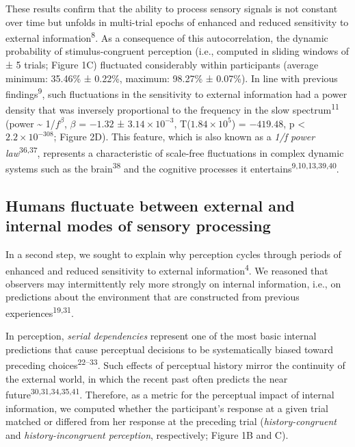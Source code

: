 \documentclass[
]{article}
\begin{document}
These results confirm that the ability to process sensory signals is not
constant over time but unfolds in multi-trial epochs of enhanced and
reduced sensitivity to external information\textsuperscript{8}. As a
consequence of this autocorrelation, the dynamic probability of
stimulus-congruent perception (i.e., computed in sliding windows of ± 5
trials; Figure 1C) fluctuated considerably within participants (average
minimum: 35.46\% ± 0.22\%, maximum: 98.27\% ± 0.07\%). In line with
previous findings\textsuperscript{9}, such fluctuations in the
sensitivity to external information had a power density that was
inversely proportional to the frequency in the slow
spectrum\textsuperscript{11} (power \textasciitilde{} 1/\(f^\beta\),
\(\beta\) = \(-1.32\) ± \(\ensuremath{3.14\times 10^{-3}}\),
T(\(\ensuremath{1.84\times 10^{5}}\)) = \(-419.48\), p < \(\ensuremath{2.2\times 10^{-308}}\); Figure
2D). This feature, which is also known as a \emph{1/f power
law}\textsuperscript{36,37}, represents a characteristic of scale-free
fluctuations in complex dynamic systems such as the
brain\textsuperscript{38} and the cognitive processes it
entertains\textsuperscript{9,10,13,39,40}.

\hypertarget{humans-fluctuate-between-external-and-internal-modes-of-sensory-processing}{%
\subsection{Humans fluctuate between external and internal modes of
sensory
processing}\label{humans-fluctuate-between-external-and-internal-modes-of-sensory-processing}}

In a second step, we sought to explain why perception cycles through
periods of enhanced and reduced sensitivity to external
information\textsuperscript{4}. We reasoned that observers may
intermittently rely more strongly on internal information, i.e., on
predictions about the environment that are constructed from previous
experiences\textsuperscript{19,31}.

In perception, \emph{serial dependencies} represent one of the most
basic internal predictions that cause perceptual decisions to be
systematically biased toward preceding choices\textsuperscript{22--33}.
Such effects of perceptual history mirror the continuity of the external
world, in which the recent past often predicts the near
future\textsuperscript{30,31,34,35,41}. Therefore, as a metric for the
perceptual impact of internal information, we computed whether the
participant's response at a given trial matched or differed from her
response at the preceding trial (\emph{history-congruent} and
\emph{history-incongruent perception}, respectively; Figure 1B and C).
\end{document}
